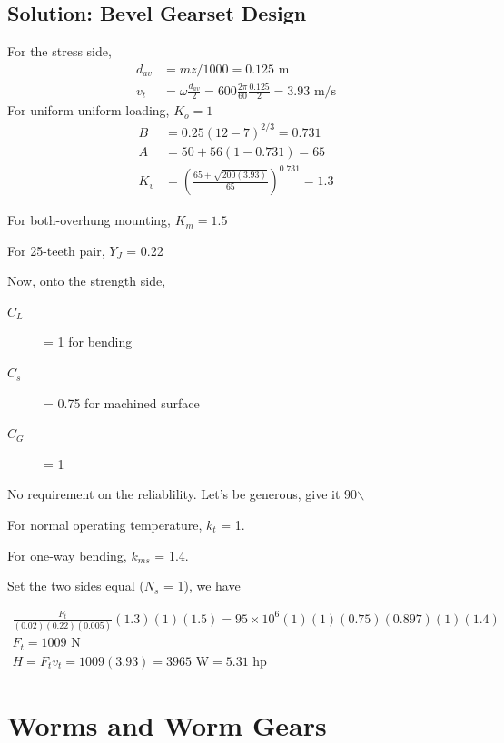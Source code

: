 \documentclass[a4paper,openany]{tufte-book}
\begin{document}
\section{Solution: Bevel Gearset Design}
\label{sec:org652ebd3}

For the stress side,
\begin{align*}
  d_{av} &= mz/1000 = 0.125 \text{ m} \\
  v_{t} &= \omega \frac{d_{av}}{2} = 600 \frac{2\pi}{60} \frac{0.125}{2} = 3.93 \text{ m/s}
\end{align*}
For uniform-uniform loading, \(K_{o} = 1\)
\begin{align*}
  B &= 0.25(12 - 7)^{2/3} = 0.731 \\
  A &= 50 + 56(1 - 0.731) = 65 \\
  K_{v} &= \left( \frac{65 + \sqrt{200(3.93)}}{65} \right)^{0.731} = 1.3
\end{align*}

For both-overhung mounting, \(K_{m} = 1.5\)

For 25-teeth pair, \(Y_{J}\) = 0.22

Now, onto the strength side,

\begin{description}
  \item[$C_L$] = 1 for bending
  \item[$C_{s}$] = 0.75 for machined surface
  \item[$C_{G}$] = 1
\end{description}

No requirement on the reliablility. Let's be generous, give it 90$\backslash$%

For normal operating temperature, \(k_{t}\) = 1.

For one-way bending, \(k_{ms}\) = 1.4.

Set the two sides equal (\(N_{s}\) = 1), we have

\begin{gather*}
  \frac{F_{t}}{(0.02)(0.22)(0.005)}(1.3)(1)(1.5) = 95 \times 10^{6} (1)(1)(0.75)(0.897)(1)(1.4) \\
  F_{t} = 1009 \text{ N} \\
  H = F_{t}v_{t} = 1009(3.93) = 3965 \text{ W} = 5.31 \text{ hp}
\end{gather*}

\chapter{Worms and Worm Gears}
\label{sec:org6b4f7a7}
\end{document}
